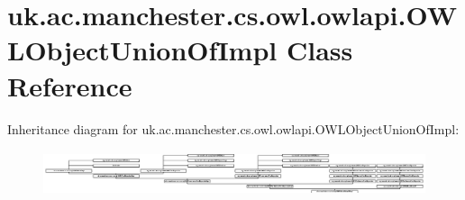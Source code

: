 \hypertarget{classuk_1_1ac_1_1manchester_1_1cs_1_1owl_1_1owlapi_1_1_o_w_l_object_union_of_impl}{\section{uk.\-ac.\-manchester.\-cs.\-owl.\-owlapi.\-O\-W\-L\-Object\-Union\-Of\-Impl Class Reference}
\label{classuk_1_1ac_1_1manchester_1_1cs_1_1owl_1_1owlapi_1_1_o_w_l_object_union_of_impl}
}
Inheritance diagram for uk.\-ac.\-manchester.\-cs.\-owl.\-owlapi.\-O\-W\-L\-Object\-Union\-Of\-Impl\-:\begin{figure}[H]
\begin{center}
\leavevmode
\includegraphics[height=1.330166cm]{classuk_1_1ac_1_1manchester_1_1cs_1_1owl_1_1owlapi_1_1_o_w_l_object_union_of_impl}
\end{center}
\end{figure}
